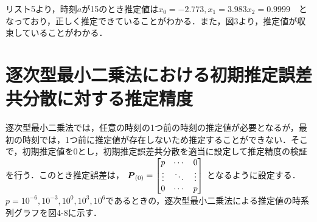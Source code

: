 \documentclass[a4paper]{jarticle}
\begin{document}
リスト5より，時刻$a$が15のとき推定値は\(x_{0}=-2.773, x_1 = 3.983 x_2 = 0.9999\)　となっており，正しく推定できていることがわかる．また，図3より，推定値が収束していることがわかる．
\newpage
\section{逐次型最小二乗法における初期推定誤差共分散に対する推定精度}
逐次型最小二乗法では，任意の時刻の1つ前の時刻の推定値が必要となるが，最初の時刻では，1つ前に推定値が存在しないため推定することができない．そこで，初期推定値を0とし，初期推定誤差共分散を適当に設定して推定精度の検証を行う．このとき推定誤差は，
\(
\mbox{\boldmath $P$}_{(0)} =
\begin{bmatrix}
{p} & \cdots & 0\\
 \vdots & \ddots & \vdots\\
0 & \cdots & {p} \\ 
\end{bmatrix} 
\)
となるように設定する．\(p=10^{-6}, 10^{-3}, 10^{0}, 10^{3}, 10^{6}\)であるときの，逐次型最小二乗法による推定値の時系列グラフを図4-8に示す．
\end{document}

